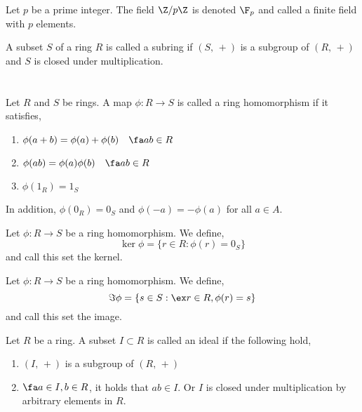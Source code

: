 \documentclass{article}
\begin{document}
\begin{ndefi}
  Let $p$ be a prime integer. The field $\Z/p\Z$ is denoted $\F_p$ and called a finite field with $p$ elements.
\end{ndefi}

\begin{ndefi}[Subring]
  A subset $S$ of a ring $R$ is called a subring if $(S,\,+)$ is a subgroup of $(R,\,+)$ and $S$ is closed under multiplication.
\end{ndefi}

\section[Ring Homorphisms and Ideals]{}

\begin{ndefi}
  Let $R$ and $S$ be rings. A map $\phi : R \to S$ is called a ring homomorphism if it satisfies,
  \begin{enumerate}
    \item $\phi(a + b) = \phi(a) + \phi(b)\quad\fa a b \in R$
    \item $\phi(ab) = \phi(a)\phi(b)\quad\fa a b \in R$
    \item $\phi(1_R) = 1_S$
  \end{enumerate}
  In addition, $\phi(0_R) = 0_S$ and $\phi(-a) = -\phi(a)$ for all $a \in A$.
\end{ndefi}

\begin{ndefi}[Kernel]
  Let $\phi : R \to S$ be a ring homomorphism. We define,
  $$ \ker \phi = \{r \in R : \phi(r) = 0_S\} $$
  and call this set the kernel.
\end{ndefi}

\begin{ndefi}[Image]
  Let $\phi : R \to S$ be a ring homomorphism. We define,
  $$ \Im \phi = \{s \in S : \ex r \in R, \phi(r) = s\} $$
  and call this set the image.
\end{ndefi}

\begin{ndefi}[Ideal]
  Let $R$ be a ring. A subset $I \subset R$ is called an ideal if the following hold,
  \begin{enumerate}
    \item $(I,\,+)$ is a subgroup of $(R,\,+)$
    \item $\fa a \in I, b \in R$, it holds that $ab \in I$. Or $I$ is closed under multiplication by arbitrary elements in $R$.
  \end{enumerate}
\end{ndefi}
\end{document}
